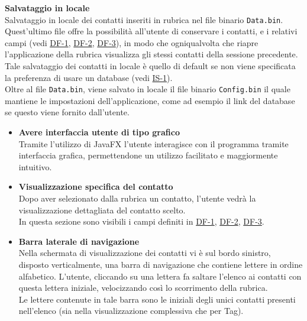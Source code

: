 \begin{tcolorbox}[colback=white,colframe=black!80!white,title=\textbf{Esigenze dei dati e informazioni DF}]
\begin{itemize}[itemsep=2pt, topsep=0pt]
		\hypertarget{DF-4}{\item[\textbf{DF-4}]} \textbf{Salvataggio in locale}
		\\Salvataggio in locale dei contatti inseriti in rubrica nel file binario \texttt{Data.bin}. Quest’ultimo file offre la possibilità all’utente di conservare i contatti, e i relativi campi (vedi \hyperlink{DF-1}{DF-1}, \hyperlink{DF-2}{DF-2}, \hyperlink{DF-3}{DF-3}), in modo che ogniqualvolta che riapre l’applicazione della rubrica visualizza gli stessi contatti della sessione precedente.
		\\Tale salvataggio dei contatti in locale è quello di default se non viene specificata la preferenza di usare un database (vedi \hyperlink{IS-1}{IS-1}).
		\\Oltre al file \texttt{Data.bin}, viene salvato in locale il file binario \texttt{Config.bin} il quale mantiene le impostazioni dell’applicazione, come ad esempio il link del database se questo viene fornito dall’utente.
		
	\end{itemize}
\end{tcolorbox}

\begin{tcolorbox}[colback=white,colframe=black!80!white,title=\textbf{Interfaccia Utente UI}]
	\begin{itemize}[itemsep=2pt, topsep=0pt]
		\item[\textbf{UI-1}] \textbf{Avere interfaccia utente di tipo grafico} 
		\\Tramite l’utilizzo di JavaFX l’utente interagisce con il programma tramite interfaccia grafica, permettendone un utilizzo facilitato e maggiormente intuitivo.
		
		\item[\textbf{UI-2}] \textbf{Visualizzazione specifica del contatto}
		\\Dopo aver selezionato dalla rubrica un contatto, l’utente vedrà la visualizzazione dettagliata del contatto scelto.
		\\In questa sezione sono visibili i campi definiti in \hyperlink{DF-1}{DF-1}, \hyperlink{DF-2}{DF-2}, \hyperlink{DF-3}{DF-3}.
		
		\item[\textbf{UI-3}] \textbf{Barra laterale di navigazione}
		\\Nella schermata di visualizzazione dei contatti vi è sul bordo sinistro, disposto verticalmente, una barra di navigazione che contiene lettere in ordine alfabetico. L’utente, cliccando su una lettera fa saltare l’elenco ai contatti con questa lettera iniziale, velocizzando così lo scorrimento della rubrica.
		\\Le lettere contenute in tale barra sono le iniziali degli unici contatti presenti nell’elenco (sia nella visualizzazione complessiva che per Tag).		
	\end{itemize}
\end{tcolorbox}

